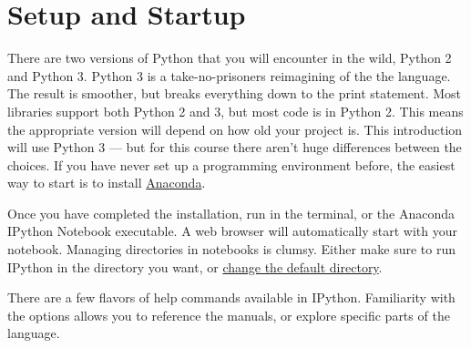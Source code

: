 \documentclass[justified, nobib]{tufte-handout}
\newcommand{\anacondaLink}{https://store.continuum.io/cshop/anaconda/}
\newcommand{\customizeDirectoryLink}
  {http://stackoverflow.com/questions/15680463/change-ipython-working-directory}
\begin{document}
\pagebreak

\section*{Setup and Startup}
There are two versions of Python that you will encounter in the wild, Python 2 and Python 3.
Python 3 is a take-no-prisoners reimagining of the the language.
The result is smoother, but breaks everything down to the print statement.
Most libraries support both Python 2 and 3, but most code is in Python 2.
This means the appropriate version will depend on how old your project is.
This introduction will use Python 3 --- but for this course there aren't huge differences between the choices.
If you have never set up a programming environment before, the easiest way to start is to install \href{\anacondaLink}{Anaconda}.

\smallskip
\noindent
Once you have completed the installation, run  in the terminal, or the Anaconda IPython Notebook executable.
A web browser will automatically start with your notebook.
Managing directories in notebooks is clumsy.
Either make sure to run IPython in the directory you want, or \href{\customizeDirectoryLink}{change the default directory}.

\smallskip
\noindent
There are a few flavors of help commands available in IPython.
Familiarity with the options allows you to reference the manuals, or explore specific parts of the language.

\end{document}

